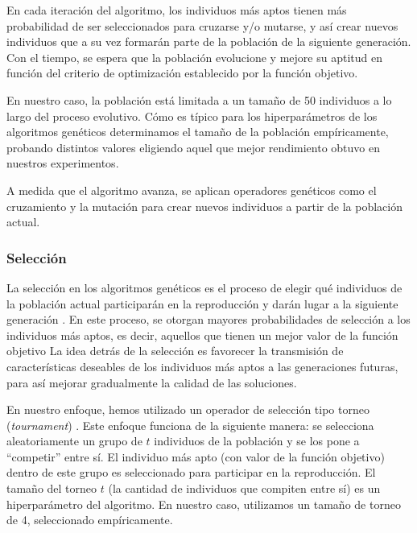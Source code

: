 En cada iteración del algoritmo, los individuos más aptos tienen más probabilidad de ser seleccionados para cruzarse y/o mutarse, 
y así crear nuevos individuos que a su vez formarán parte de la población de la siguiente generación. Con el tiempo, se espera que la población evolucione y
mejore su aptitud en función del criterio de optimización establecido por la función objetivo.

En nuestro caso, la población está limitada a un tamaño de 50 individuos a lo largo del proceso evolutivo.
Cómo es típico para los hiperparámetros de los algoritmos genéticos determinamos el tamaño de la población empíricamente, probando distintos valores
eligiendo aquel que mejor rendimiento obtuvo en nuestros experimentos.

A medida que el algoritmo avanza, se aplican operadores genéticos como el cruzamiento y la mutación para crear nuevos individuos a partir de la población actual.

\subsubsection{Selección}
\label{sec:selection}
La selección en los algoritmos genéticos es el proceso de elegir qué individuos de la población actual participarán en la reproducción y darán lugar a la siguiente generación \cite{Goldberg:1989}. En este proceso, se otorgan mayores probabilidades de selección a los individuos más aptos, es decir, aquellos que tienen un mejor valor de la función objetivo \cite{Goldberg:1989}
La idea detrás de la selección es favorecer la transmisión de características deseables de los individuos más aptos a las generaciones futuras, para así mejorar gradualmente la calidad de las soluciones.

En nuestro enfoque, hemos utilizado un operador de selección tipo torneo (\emph{tournament}) \cite{Goldberg:1989}. Este enfoque funciona de la siguiente manera: se selecciona aleatoriamente un grupo de $t$ individuos de la población y se los pone a ``competir'' entre sí. El individuo más apto (con valor de la función objetivo) dentro de este grupo es seleccionado para participar en la reproducción. El tamaño del torneo $t$ (la cantidad de individuos que compiten entre sí) es un hiperparámetro del algoritmo. En nuestro caso, utilizamos un tamaño de torneo de 4, seleccionado empíricamente.

